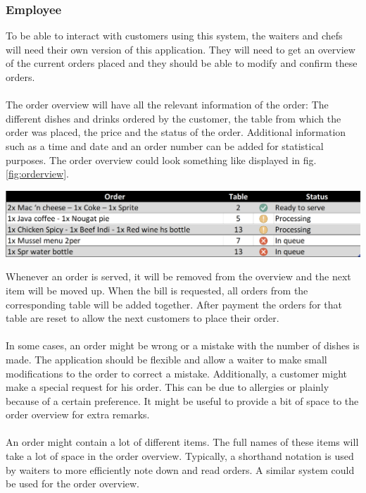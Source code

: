 \documentclass[12pt]{article}
\newenvironment{Figure}
	{\par\medskip\noindent\minipage{\linewidth}}
	{\endminipage\par\medskip}
\begin{document}
\begin{multicols}{2}
\subsubsection{Employee}
To be able to interact with customers using this system, the waiters and chefs will need their own version of this application. They will need to get an overview of the current orders placed and they should be able to modify and confirm these orders.
\\\\
The order overview will have all the relevant information of the order: The different dishes and drinks ordered by the customer, the table from which the order was placed, the price and the status of the order. Additional information such as a time and date and an order number can be added for statistical purposes.
The order overview could look something like displayed in fig. \ref{fig:orderview}.
\begin{Figure}
	\includegraphics[width=\linewidth]{illustrations/orderview.PNG}
	\label{fig:orderview}
\end{Figure}
Whenever an order is served, it will be removed from the overview and the next item will be moved up. When the bill is requested, all orders from the corresponding table will be added together. After payment the orders for that table are reset to allow the next customers to place their order.
\\\\
In some cases, an order might be wrong or a mistake with the number of dishes is made. The application should be flexible and allow a waiter to make small modifications to the order to correct a mistake.
Additionally, a customer might make a special request for his order. This can be due to allergies or plainly because of a certain preference. It might be useful to provide a bit of space to the order overview for extra remarks.
\\\\
An order might contain a lot of different items. The full names of these items will take a lot of space in the order overview. Typically, a shorthand notation is used by waiters to more efficiently note down and read orders. A similar system could be used for the order overview.

\end{multicols}
\end{document}
